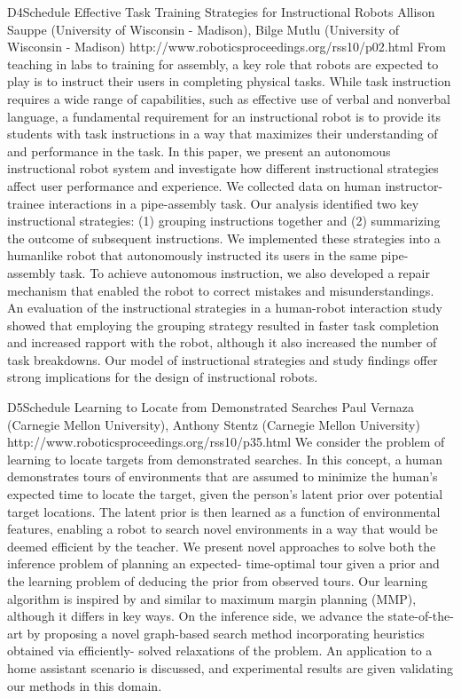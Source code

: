 \begin{spacing}{1.0}
\descriptionPaper
{D4}{Schedule}
{	
Effective Task Training Strategies for Instructional Robots 
}
{
Allison Sauppe (University of Wisconsin - Madison), Bilge Mutlu (University of Wisconsin - Madison)
}
{
http://www.roboticsproceedings.org/rss10/p02.html
}
{
From teaching in labs to training for assembly, a key role that robots are expected to play is to instruct their users in completing physical tasks. While task instruction requires a wide range of capabilities, such as effective use of verbal and nonverbal language, a fundamental requirement for an instructional robot is to provide its students with task instructions in a way that maximizes their understanding of and performance in the task. In this paper, we present an autonomous instructional robot system and investigate how different instructional strategies affect user performance and experience. We collected data on human instructor-trainee interactions in a pipe-assembly task. Our analysis identified two key instructional strategies: (1) grouping instructions together and (2) summarizing the outcome of subsequent instructions. We implemented these strategies into a humanlike robot that autonomously instructed its users in the same pipe-assembly task. To achieve autonomous instruction, we also developed a repair mechanism that enabled the robot to correct mistakes and misunderstandings. An evaluation of the instructional strategies in a human-robot interaction study showed that employing the grouping strategy resulted in faster task completion and increased rapport with the robot, although it also increased the number of task breakdowns. Our model of instructional strategies and study findings offer strong implications for the design of instructional robots.
}



\descriptionPaper
{D5}{Schedule}
{	
Learning to Locate from Demonstrated Searches 
}
{
Paul Vernaza (Carnegie Mellon University), Anthony Stentz (Carnegie Mellon University)
}
{
http://www.roboticsproceedings.org/rss10/p35.html
}
{
We consider the problem of learning to locate targets from demonstrated searches. In this concept, a human demonstrates tours of environments that are assumed to minimize the human’s expected time to locate the target, given the person’s latent prior over potential target locations. The latent prior is then learned as a function of environmental features, enabling a robot to search novel environments in a way that would be deemed efficient by the teacher. We present novel approaches to solve both the inference problem of planning an expected- time-optimal tour given a prior and the learning problem of deducing the prior from observed tours. Our learning algorithm is inspired by and similar to maximum margin planning (MMP), although it differs in key ways. On the inference side, we advance the state-of-the-art by proposing a novel graph-based search method incorporating heuristics obtained via efficiently- solved relaxations of the problem. An application to a home assistant scenario is discussed, and experimental results are given validating our methods in this domain.
}




\end{spacing}
